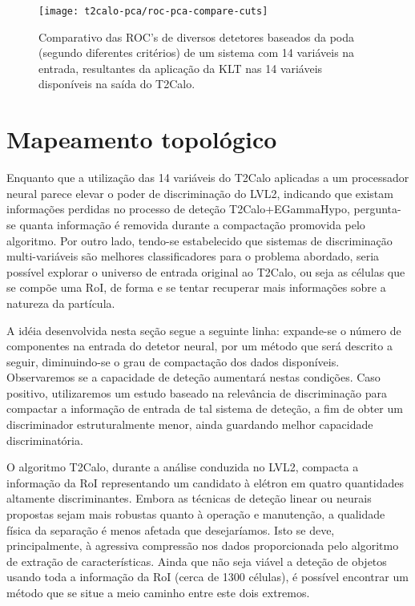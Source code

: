 \begin{figure}
\begin{center}
\texttt{[image: t2calo-pca/roc-pca-compare-cuts]}
\end{center}
\caption{Comparativo das ROC's de diversos detetores baseados da poda (segundo
diferentes critérios) de um sistema com 14 variáveis na entrada, resultantes
da aplicação da KLT nas 14 variáveis disponíveis na saída do T2Calo.}
\label{fig:roc-pca-compare-cuts}
\end{figure}

\section{Mapeamento topológico}

Enquanto que a utilização das 14 variáveis do T2Calo aplicadas a um
processador neural parece elevar o poder de discriminação do LVL2, indicando
que existam informações perdidas no processo de deteção T2Calo+EGammaHypo,
pergunta-se quanta informação é removida durante a compactação promovida pelo
algoritmo. Por outro lado, tendo-se estabelecido que sistemas de discriminação
multi-variáveis são melhores classificadores para o problema abordado, seria
possível explorar o universo de entrada original ao T2Calo, ou seja as células
que se compõe uma RoI, de forma e se tentar recuperar mais informações sobre a
natureza da partícula.

A idéia desenvolvida nesta seção segue a seguinte linha: expande-se o número
de componentes na entrada do detetor neural, por um método que será descrito a
seguir, diminuindo-se o grau de compactação dos dados
disponíveis. Observaremos se a capacidade de deteção aumentará nestas
condições. Caso positivo, utilizaremos um estudo baseado na relevância de 
discriminação para compactar a informação de entrada de tal sistema de
deteção, a fim de obter um discriminador estruturalmente menor, ainda
guardando melhor capacidade discriminatória.

O algoritmo T2Calo, durante a análise conduzida no LVL2, compacta a informação
da RoI representando um candidato à elétron em quatro quantidades altamente
discriminantes. Embora as técnicas de deteção linear ou neurais propostas sejam
mais robustas quanto à operação e manutenção, a qualidade física da separação
é menos afetada que desejaríamos. Isto se deve, principalmente, à agressiva
compressão nos dados proporcionada pelo algoritmo de extração de
características. Ainda que não seja viável a deteção de objetos usando toda a
informação da RoI (cerca de 1300 células), é possível encontrar um método que
se situe a meio caminho entre este dois extremos.

